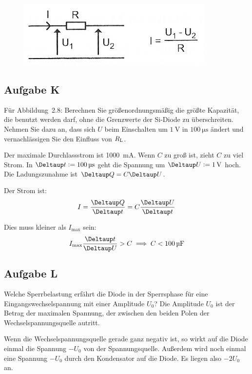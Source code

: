 \begin{figure}[htbp]
	\centering
	\caption{%
		\cite[Abbildung~2.7]{physik313-Anleitung}
	}
	\label{fig:2-7}
	\includegraphics[width=.6\linewidth]{Bilder_aus_Anleitung/2-7.png}
\end{figure}

\FloatBarrier
\subsection{Aufgabe K}

\begin{problem}
	Für Abbildung~2.8: Berechnen Sie größenordnungsmäßig die größte Kapazität,
	die benutzt werden darf, ohne die Grenzwerte der Si-Diode zu überschreiten.
	Nehmen Sie dazu an, dass sich $U$ beim Einschalten um $\SI{1}\volt$ in
	$\SI{100}{\micro\second}$ ändert und vernachlässigen Sie den Einfluss von
	$R_\text L$.
\end{problem}

Der maximale Durchlassstrom ist \SI{1000}{\milli\ampere}. Wenn $C$ zu groß ist,
zieht $C$ zu viel Strom. In $\Deltaup t := \SI{100}{\micro\second}$ geht die
Spannung um $\Deltaup U := \SI1\volt$ hoch. Die Ladungszunahme ist $\Deltaup Q
= C \Deltaup U$.

Der Strom ist:
\[
	I = \frac{\Deltaup Q}{\Deltaup t}
	= C \frac{\Deltaup U}{\Deltaup t}
\]

Dies muss kleiner als $I_\text{max}$ sein:
\[
	I_\text{max} \frac{\Deltaup t}{\Deltaup U} > C
	\implies
	C < \SI{100}{\micro\farad}
\]

\FloatBarrier
\subsection{Aufgabe L}

\begin{problem}
	Welche Sperrbelastung erfährt die Diode in der Sperrsphase für eine
	Eingangswechselspannung mit einer Amplitude $U_0$? Die Amplitude $U_0$ ist
	der Betrag der maximalen Spannung, der zwischen den beiden Polen der
	Wechselspannungsquelle autritt.
\end{problem}

Wenn die Wechselspannungsquelle gerade ganz negativ ist, so wirkt auf die Diode
einmal die Spannung $- U_0$ von der Spannungsquelle. Außerdem wird noch einmal
eine Spannung $-U_0$ durch den Kondensator auf die Diode. Es liegen also
$-2U_0$ an.


